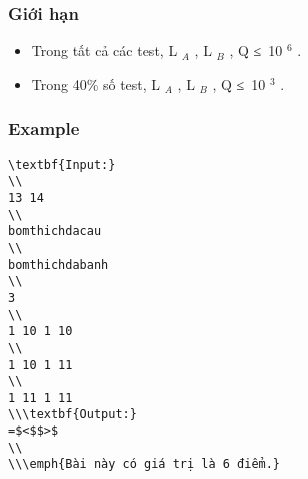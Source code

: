 \subsubsection{   Giới hạn  }
\begin{itemize}
	\item     Trong tất cả các test, L    $_     A    $    , L    $_     B    $    , Q ≤ 10    $^     6    $    .   
	\item     Trong 40\% số test, L    $_     A    $    , L    $_     B    $    , Q ≤ 10    $^     3    $    .   
\end{itemize}

\subsubsection{   Example  }
\begin{verbatim}
\textbf{Input:}
\\
13 14
\\
bomthichdacau
\\
bomthichdabanh
\\
3
\\
1 10 1 10
\\
1 10 1 11
\\
1 11 1 11
\\\textbf{Output:}
=$<$$>$
\\
\\\emph{Bài này có giá trị là 6 điểm.}\end{verbatim}
